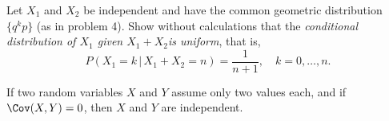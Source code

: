 \begin{problem}[Handout 15, \# 19]
  Let \(X_1\) and \(X_2\) be independent and have the common
  geometric distribution \(\{q^kp\}\) (as in problem 4). Show without
  calculations that the \emph{conditional distribution of \(X_1\) given
    \(X_1+X_2\)is uniform}, that is,
  \begin{equation}
    \label{eq:12:uniform-conditional-pmf}
    P(X_1=k\,|\,X_1+X_2=n)=\frac{1}{n+1},\quad k=0,\dotsc,n.
  \end{equation}
\end{problem}
\begin{solution}

\end{solution}
\newpage

\begin{problem}[Handout 15, \# 20]
  If two random variables \(X\) and \(Y\) assume only two values
  each, and if \(\Cov(X,Y)=0\), then \(X\) and \(Y\) are
  independent.
\end{problem}
\begin{solution}

\end{solution}

